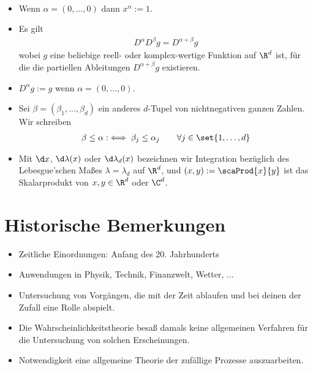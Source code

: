 \begin{bemerkung}\
	\begin{itemize}
		\item Wenn $\alpha=(0,\ldots,0)$ dann $x^\alpha:=1$.
		\item Es gilt
		\begin{align*}
			D^\alpha D^\beta g=D^{\alpha+\beta} g
		\end{align*}				
		wobei $g$ eine beliebige reell- oder komplex-wertige Funktion auf $\R^d$ ist, für die die partiellen Ableitungen $D^{\alpha+\beta}g$ existieren.
		\item $D^\alpha g:= g$ wenn $\alpha=(0,\ldots,0)$.
		\item Sei $\beta=(\beta_1,\ldots,\beta_d)$ ein anderes $d$-Tupel von nichtnegativen ganzen Zahlen.
		Wir schreiben
		\begin{align*}
			\beta\leq\alpha:\iff\beta_j\leq\alpha_j\qquad\forall j\in\set{1,\ldots,d}
		\end{align*}
		\item Mit $\d x$, $\d\lambda(x)$ oder $\d\lambda_d(x)$ bezeichnen wir Integration bezüglich des Lebesgue'schen Maßes $\lambda=\lambda_d$ auf $\R^d$, und $(x,y):=\scaProd{x}{y}$ ist das Skalarprodukt von $x,y\in\R^d$ oder $\C^d$.
	\end{itemize}
\end{bemerkung}

\section{Historische Bemerkungen}
\begin{itemize}
	\item Zeitliche Einordnungen: Anfang des 20. Jahrhunderts
	\item Anwendungen in Physik, Technik, Finanzwelt, Wetter, $\ldots$
	\item Untersuchung von Vorgängen, die mit der Zeit ablaufen und bei deinen der Zufall eine Rolle abspielt.
	\item Die Wahrscheinlichkeitstheorie besaß damals keine allgemeinen Verfahren für die Untersuchung von solchen Erscheinungen.
	\item Notwendigkeit eine allgemeine Theorie der zufällige Prozesse auszuarbeiten.
\end{itemize}

